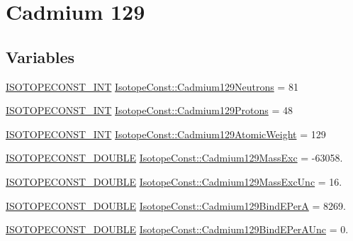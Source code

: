 \hypertarget{group___isotope_const-_cadmium-_cd129}{}\section{Cadmium 129}
\label{group___isotope_const-_cadmium-_cd129}
\subsection*{Variables}
\begin{DoxyCompactItemize}
\item 
\mbox{\hyperlink{group___isotope_const-_macros_ga5f18360b3e99483a35c32d789e62621c}{I\+S\+O\+T\+O\+P\+E\+C\+O\+N\+S\+T\+\_\+\+I\+NT}} \mbox{\hyperlink{group___isotope_const-_cadmium-_cd129_ga7a37df0769302b018f262e83f673bb95}{Isotope\+Const\+::\+Cadmium129\+Neutrons}} = 81
\item 
\mbox{\hyperlink{group___isotope_const-_macros_ga5f18360b3e99483a35c32d789e62621c}{I\+S\+O\+T\+O\+P\+E\+C\+O\+N\+S\+T\+\_\+\+I\+NT}} \mbox{\hyperlink{group___isotope_const-_cadmium-_cd129_ga15a6b9712debbdd2aea07d04e10dc3db}{Isotope\+Const\+::\+Cadmium129\+Protons}} = 48
\item 
\mbox{\hyperlink{group___isotope_const-_macros_ga5f18360b3e99483a35c32d789e62621c}{I\+S\+O\+T\+O\+P\+E\+C\+O\+N\+S\+T\+\_\+\+I\+NT}} \mbox{\hyperlink{group___isotope_const-_cadmium-_cd129_gaa3d36444f0eaf5145e1f515fbec75652}{Isotope\+Const\+::\+Cadmium129\+Atomic\+Weight}} = 129
\item 
\mbox{\hyperlink{group___isotope_const-_macros_ga8f45a7272ce02c0b4c65c44636ed719a}{I\+S\+O\+T\+O\+P\+E\+C\+O\+N\+S\+T\+\_\+\+D\+O\+U\+B\+LE}} \mbox{\hyperlink{group___isotope_const-_cadmium-_cd129_ga0a46aa689730229ee99310161325f0b3}{Isotope\+Const\+::\+Cadmium129\+Mass\+Exc}} = -\/63058.
\item 
\mbox{\hyperlink{group___isotope_const-_macros_ga8f45a7272ce02c0b4c65c44636ed719a}{I\+S\+O\+T\+O\+P\+E\+C\+O\+N\+S\+T\+\_\+\+D\+O\+U\+B\+LE}} \mbox{\hyperlink{group___isotope_const-_cadmium-_cd129_ga4bbb2ecd1838ed3fcf62742dd9b0d2bd}{Isotope\+Const\+::\+Cadmium129\+Mass\+Exc\+Unc}} = 16.
\item 
\mbox{\hyperlink{group___isotope_const-_macros_ga8f45a7272ce02c0b4c65c44636ed719a}{I\+S\+O\+T\+O\+P\+E\+C\+O\+N\+S\+T\+\_\+\+D\+O\+U\+B\+LE}} \mbox{\hyperlink{group___isotope_const-_cadmium-_cd129_ga64407ac7e4d86da5b045a0d060c12b59}{Isotope\+Const\+::\+Cadmium129\+Bind\+E\+PerA}} = 8269.
\item 
\mbox{\hyperlink{group___isotope_const-_macros_ga8f45a7272ce02c0b4c65c44636ed719a}{I\+S\+O\+T\+O\+P\+E\+C\+O\+N\+S\+T\+\_\+\+D\+O\+U\+B\+LE}} \mbox{\hyperlink{group___isotope_const-_cadmium-_cd129_ga6914ce7d08f7eb278c8157c8dc739ba0}{Isotope\+Const\+::\+Cadmium129\+Bind\+E\+Per\+A\+Unc}} = 0.

\end{DoxyCompactItemize}
